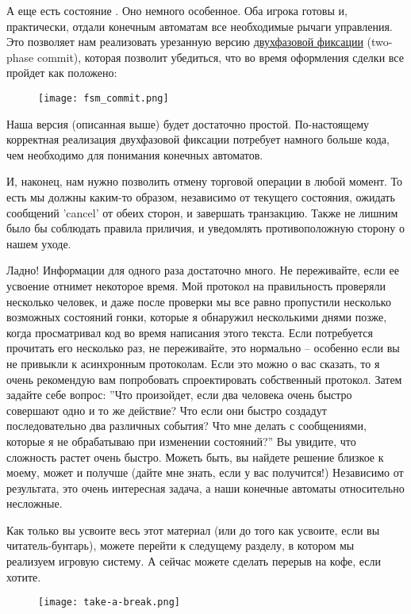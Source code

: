 А еще есть состояние .
Оно немного особенное.
Оба игрока готовы и, практически, отдали конечным автоматам все необходимые рычаги управления.
Это позволяет нам реализовать урезанную версию \href{http://en.wikipedia.org/wiki/Two-phase\_commit}{двухфазовой фиксации} (two-phase commit), которая позволит убедиться, что во время оформления сделки все пройдет как положено:

\begin{figure}[H]
    \centering
    \texttt{[image: fsm\_commit.png]}
\end{figure}

Наша версия (описанная выше) будет достаточно простой.
По\--настоящему корректная реализация двухфазовой фиксации потребует намного больше кода, чем необходимо для понимания конечных автоматов.

И, наконец, нам нужно позволить отмену торговой операции в любой момент.
То есть мы должны каким\--то образом, независимо от текущего состояния, ожидать сообщений 'cancel' от обеих сторон, и завершать транзакцию.
Также не лишним было бы соблюдать правила приличия, и уведомлять противоположную сторону о нашем уходе.

Ладно!
Информации для одного раза достаточно много.
Не переживайте, если ее усвоение отнимет некоторое время.
Мой протокол на правильность проверяли несколько человек, и даже после проверки мы все равно пропустили несколько возможных состояний гонки, которые я обнаружил несколькими днями позже, когда просматривал код во время написания этого текста.
Если потребуется прочитать его несколько раз, не переживайте, это нормально \--- особенно если вы не привыкли к асинхронным протоколам.
Если это можно о вас сказать, то я очень рекомендую вам попробовать спроектировать собственный протокол.
Затем задайте себе вопрос: ''Что произойдет, если два человека очень быстро совершают одно и то же действие?
Что если они быстро создадут последовательно два различных события?
Что мне делать с сообщениями, которые я не обрабатываю при изменении состояний?''
Вы увидите, что сложность растет очень быстро.
Можеть быть, вы найдете решение близкое к моему, может и получше (дайте мне знать, если у вас получится!)
Независимо от результата, это очень интересная задача, а наши конечные автоматы относительно несложные.

Как только вы усвоите весь этот материал (или до того как усвоите, если вы читатель\--бунтарь), можете перейти к следущему разделу, в котором мы реализуем игровую систему.
А сейчас можете сделать перерыв на кофе, если хотите.

\begin{figure}[H]
    \centering
    \texttt{[image: take-a-break.png]}
\end{figure}
